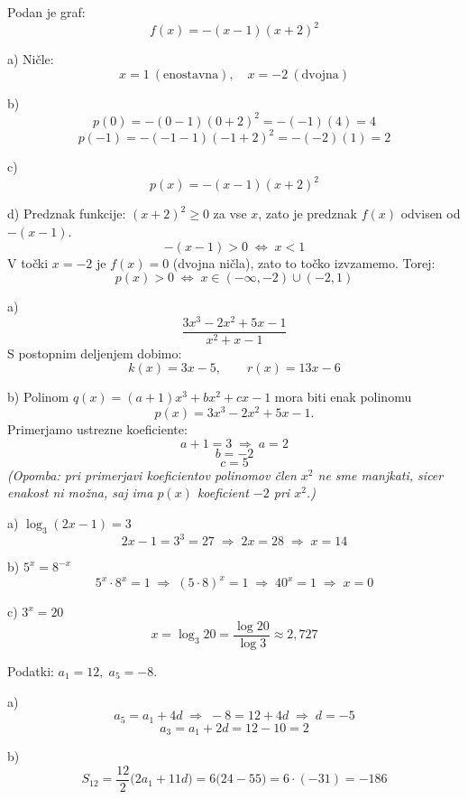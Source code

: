 \documentclass[a4paper,12pt]{letter}
\begin{document}
\begin{resitev}

Podan je graf:
\[
f(x)=-(x-1)(x+2)^2
\]

a) Ničle:
\[
x=1 \ (\text{enostavna}), \quad x=-2 \ (\text{dvojna})
\]

b)
\[
p(0)=-(0-1)(0+2)^2=-(-1)(4)=4
\]
\[
p(-1)=-(-1-1)(-1+2)^2=-(-2)(1)=2
\]

c)
\[
p(x)=-(x-1)(x+2)^2
\]

d) Predznak funkcije: $(x+2)^2\ge 0$ za vse $x$, zato je predznak $f(x)$ odvisen od $-(x-1)$.
\[
-(x-1)>0 \;\Leftrightarrow\; x<1
\]
V točki $x=-2$ je $f(x)=0$ (dvojna ničla), zato to točko izvzamemo. Torej:
\[
p(x)>0 \;\Leftrightarrow\; x\in(-\infty,-2)\cup(-2,1)
\]
\end{resitev}

\vspace{0.5cm}

\begin{resitev}

a)
\[
\frac{3x^3-2x^2+5x-1}{x^2+x-1}
\]
S postopnim deljenjem dobimo:
\[
k(x)=3x-5,\qquad r(x)=13x-6
\]

b) Polinom $q(x)=(a+1)x^3+bx^2+cx-1$ mora biti enak polinomu
\[
p(x)=3x^3-2x^2+5x-1.
\]
Primerjamo ustrezne koeficiente:
\[
a+1=3 \;\Rightarrow\; a=2
\]
\[
b=-2
\]
\[
c=5
\]
\textit{(Opomba: pri primerjavi koeficientov polinomov \v{c}len $x^2$ ne sme manjkati, sicer enakost ni mo\v{z}na, saj ima $p(x)$ koeficient $-2$ pri $x^2$.)}
\end{resitev}

\newpage

\begin{resitev}

a) $\log_3(2x-1)=3$
\[
2x-1=3^3=27 \;\Rightarrow\; 2x=28 \;\Rightarrow\; x=14
\]

b) $5^x=8^{-x}$
\[
5^x\cdot 8^x=1 \;\Rightarrow\; (5\cdot8)^x=1 \;\Rightarrow\; 40^x=1 \;\Rightarrow\; x=0
\]

c) $3^x=20$
\[
x=\log_3 20=\frac{\log 20}{\log 3}\approx 2{,}727
\]
\end{resitev}

\vspace{0.5cm}

\begin{resitev}

Podatki: $a_1=12,\; a_5=-8$.

a)
\[
a_5=a_1+4d \;\Rightarrow\; -8=12+4d \;\Rightarrow\; d=-5
\]
\[
a_3=a_1+2d=12-10=2
\]

b)
\[
S_{12}=\frac{12}{2}\big(2a_1+11d\big)=6\big(24-55\big)=6\cdot(-31)=-186
\]
\end{resitev}
\end{document}
